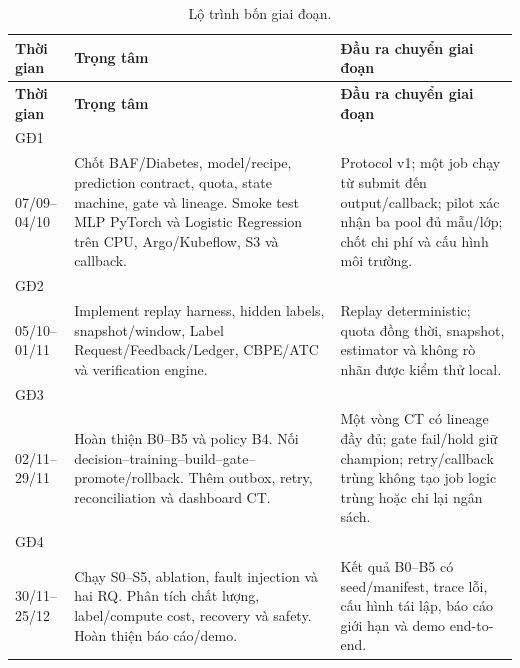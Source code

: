 \begin{longtable}{@{}L{2.4cm} L{\dimexpr(\linewidth-2.4cm-4\tabcolsep)/2\relax} L{\dimexpr(\linewidth-2.4cm-4\tabcolsep)/2\relax}@{}}
\caption{Lộ trình bốn giai đoạn.}\label{tab:summary-roadmap}\\
\toprule\textbf{Thời gian} & \textbf{Trọng tâm} & \textbf{Đầu ra chuyển giai đoạn}\\
\midrule\endfirsthead
\toprule\textbf{Thời gian} & \textbf{Trọng tâm} & \textbf{Đầu ra chuyển giai đoạn}\\
\midrule\endhead
GĐ1\\07/09--04/10 & Chốt BAF/Diabetes, model/recipe, prediction contract, quota, state machine, gate và lineage. Smoke test MLP PyTorch và Logistic Regression trên CPU, Argo/Kubeflow, S3 và callback. & Protocol v1; một job chạy từ submit đến output/callback; pilot xác nhận ba pool đủ mẫu/lớp; chốt chi phí và cấu hình môi trường.\\
GĐ2\\05/10--01/11 & Implement replay harness, hidden labels, snapshot/window, Label Request/Feedback/Ledger, CBPE/ATC và verification engine. & Replay deterministic; quota đồng thời, snapshot, estimator và không rò nhãn được kiểm thử local.\\
GĐ3\\02/11--29/11 & Hoàn thiện B0--B5 và policy B4. Nối decision--training--build--gate--promote/rollback. Thêm outbox, retry, reconciliation và dashboard CT. & Một vòng CT có lineage đầy đủ; gate fail/hold giữ champion; retry/callback trùng không tạo job logic trùng hoặc chi lại ngân sách.\\
GĐ4\\30/11--25/12 & Chạy S0--S5, ablation, fault injection và hai RQ. Phân tích chất lượng, label/compute cost, recovery và safety. Hoàn thiện báo cáo/demo. & Kết quả B0--B5 có seed/manifest, trace lỗi, cấu hình tái lập, báo cáo giới hạn và demo end-to-end.\\
\bottomrule
\end{longtable}

